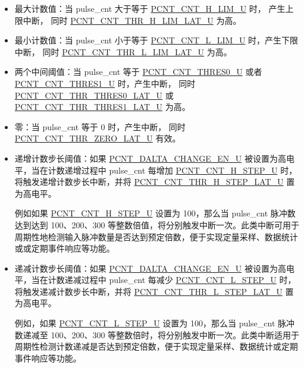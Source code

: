 \documentclass[main\_\_CN.tex]{subfiles}
\begin{document}
\begin{itemize}
    \item 最大计数值：当 pulse\_cnt 大于等于 \hyperref[fielddesc:PCNTCNTHLIMUN]{PCNT\_CNT\_H\_LIM\_U} 时， 产生上限中断， 同时 \hyperref[fielddesc:PCNTCNTTHRHLIMLATUN]{PCNT\_CNT\_THR\_H\_LIM\_LAT\_U} 为高。
    \item 最小计数值：当 pulse\_cnt 小于等于 \hyperref[fielddesc:PCNTCNTLLIMUN]{PCNT\_CNT\_L\_LIM\_U} 时，产生下限中断， 同时 \hyperref[fielddesc:PCNTCNTTHRLLIMLATUN]{PCNT\_CNT\_THR\_L\_LIM\_LAT\_U} 为高。
    \item 两个中间阈值：当 pulse\_cnt 等于 \hyperref[fielddesc:PCNTCNTTHRES0UN]{PCNT\_CNT\_THRES0\_U} 或者 \hyperref[fielddesc:PCNTCNTTHRES1UN]{PCNT\_CNT\_THRES1\_U} 时，产生中断， 同时 \hyperref[fielddesc:PCNTCNTTHRTHRES0LATUN]{PCNT\_CNT\_THR\_THRES0\_LAT\_U} 或 \hyperref[fielddesc:PCNTCNTTHRTHRES1LATUN]{PCNT\_CNT\_THR\_THRES1\_LAT\_U} 为高。
    \item 零：当 pulse\_cnt 等于 0 时，产生中断， 同时 \hyperref[fielddesc:PCNTCNTTHRZEROLATUN]{PCNT\_CNT\_THR\_ZERO\_LAT\_U} 有效。
    \item 递增计数步长阈值：如果 \hyperref[fielddesc:PCNTDALTACHANGEENUN]{PCNT\_DALTA\_CHANGE\_EN\_U} 被设置为高电平，当在计数递增过程中 pulse\_cnt 每增加 \hyperref[fielddesc:PCNTCNTHSTEPUN]{PCNT\_CNT\_H\_STEP\_U} 时，将触发递增计数步长中断，并将 \hyperref[fielddesc:PCNTCNTTHRHSTEPLATUN]{PCNT\_CNT\_THR\_H\_STEP\_LAT\_U} 置为高电平。

    例如如果 \hyperref[fielddesc:PCNTCNTHSTEPUN]{PCNT\_CNT\_H\_STEP\_U} 设置为 100，那么当 pulse\_cnt 脉冲数达到达到 100、200、300 等整数倍值，将分别触发中断一次。此类中断可用于周期性地检测输入脉冲数量是否达到预定倍数，便于实现定量采样、数据统计或或定期事件响应等功能。

    \item 递减计数步长阈值：如果 \hyperref[fielddesc:PCNTDALTACHANGEENUN]{PCNT\_DALTA\_CHANGE\_EN\_U} 被设置为高电平，当在计数递减过程中 pulse\_cnt 每减少 \hyperref[fielddesc:PCNTCNTLSTEPUN]{PCNT\_CNT\_L\_STEP\_U} 时，将触发递减计数步长中断，并将 \hyperref[fielddesc:PCNTCNTTHRLSTEPLATUN]{PCNT\_CNT\_THR\_L\_STEP\_LAT\_U} 置为高电平。

    例如，如果 \hyperref[fielddesc:PCNTCNTLSTEPUN]{PCNT\_CNT\_L\_STEP\_U} 设置为 100，那么当 pulse\_cnt 脉冲数递减至 100、200、300 等整数倍时，将分别触发中断一次。此类中断适用于周期性检测计数递减是否达到预定倍数，便于实现定量采样、数据统计或定期事件响应等功能。
\end{itemize}
\end{document}
